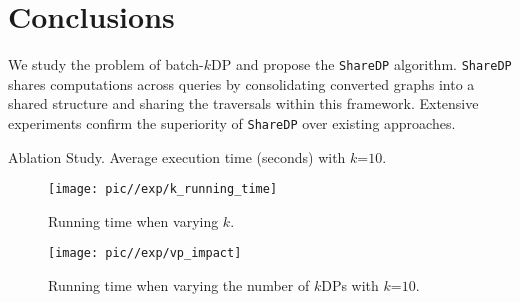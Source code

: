 
\section {Conclusions}
\label{sec:conclusion}
We study the problem of batch-$k$DP and propose the \texttt{ShareDP} algorithm. 
\texttt{ShareDP} shares computations across queries by 
    consolidating converted graphs into a shared structure and 
    sharing the traversals within this framework. 
Extensive experiments confirm the superiority of \texttt{ShareDP} over existing approaches.

\begin{table}[!h]
    \centering
    \caption{Ablation Study. Average execution time (seconds) with $k$=$10$. }
    {
        
    }
    \label{tab:optimization_impact}
\end{table}

\begin{figure}
    \centering
    \texttt{[image: pic//exp/k\_running\_time]}
    \caption{Running time when varying $k$.}
    \label{fig:running_time}
\end{figure}

\begin{figure}
    \centering
    \texttt{[image: pic//exp/vp\_impact]}
    \caption{Running time when varying the number of $k$DPs with $k$=$10$.}
    \label{fig:vpcnt_impact}
\end{figure}

